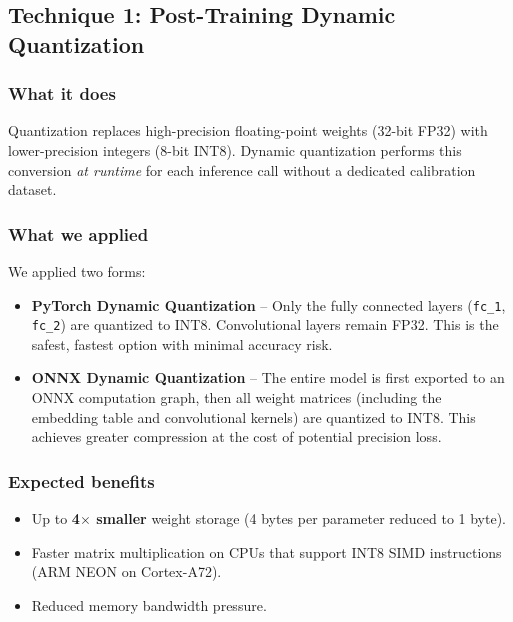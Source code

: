 \documentclass[12pt,a4paper]{article}
\begin{document}
\subsection{Technique 1: Post-Training Dynamic Quantization}

\subsubsection{What it does}
Quantization replaces high-precision floating-point weights (32-bit FP32)
with lower-precision integers (8-bit INT8).  Dynamic quantization performs
this conversion \textit{at runtime} for each inference call without a
dedicated calibration dataset.

\subsubsection{What we applied}
We applied two forms:
\begin{itemize}
  \item \textbf{PyTorch Dynamic Quantization} -- Only the fully connected
        layers (\texttt{fc\_1}, \texttt{fc\_2}) are quantized to INT8.
        Convolutional layers remain FP32.  This is the safest, fastest
        option with minimal accuracy risk.
  \item \textbf{ONNX Dynamic Quantization} -- The entire model is first
        exported to an ONNX computation graph, then all weight matrices
        (including the embedding table and convolutional kernels) are
        quantized to INT8.  This achieves greater compression at the cost of
        potential precision loss.
\end{itemize}

\subsubsection{Expected benefits}
\begin{itemize}
  \item Up to \textbf{4$\times$ smaller} weight storage (4 bytes per parameter
        reduced to 1 byte).
  \item Faster matrix multiplication on CPUs that support INT8 SIMD
        instructions (ARM NEON on Cortex-A72).
  \item Reduced memory bandwidth pressure.
\end{itemize}

\end{document}
